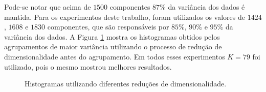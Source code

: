 \documentclass[conference]{IEEEtran}
\begin{document}
Pode-se notar que acima de $1500$ componentes $87\%$  da variância dos dados é mantida. Para os experimentos deste trabalho, foram utilizados os valores de $1424$, $1608$ e $1830$ componentes, que são responsáveis por $85\%$, $90\%$ e $95\%$ da variância dos dados. A Figura \ref{fig:clusters_pca} mostra os histogramas obtidos pelos agrupamentos de maior variância utilizando o processo de redução de dimensionalidade antes do agrupamento. Em todos esses experimentos $K = 79$ foi utilizado, pois o mesmo mostrou melhores resultados.


\begin{figure}[!h]
	\centering
	{
		{
		}
		\label{fig:pca95}
	}\smallskip
	{
		{
		}
		\label{fig:pca90}
	}\smallskip
	{
		{
		}
		\label{fig:pca85}
	}
	\caption{Histogramas utilizando diferentes reduções de dimensionalidade.}
	\label{fig:clusters_pca}
\end{figure}
\end{document}
